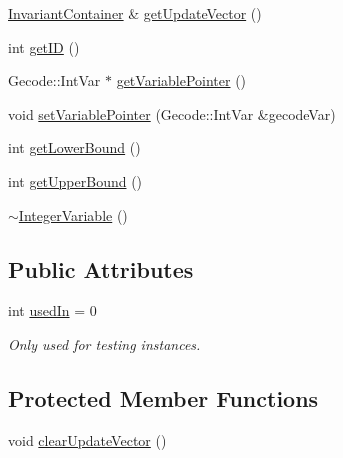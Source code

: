 \begin{DoxyCompactItemize}
\item 
\hyperlink{_constants_8hpp_a5ea9d0c2efe357d2a7f5bcd80cdf179a}{Invariant\-Container} \& \hyperlink{class_integer_variable_a20399e3432e0c85d5e182ad46bb3213c}{get\-Update\-Vector} ()
\item 
int \hyperlink{class_integer_variable_a5727e5eab36698720856f869fe29a861}{get\-I\-D} ()
\item 
Gecode\-::\-Int\-Var $\ast$ \hyperlink{class_integer_variable_a876ac87baa262f777360ee808c80520e}{get\-Variable\-Pointer} ()
\item 
void \hyperlink{class_integer_variable_aa61e4b1eff871273612179b692fc9e85}{set\-Variable\-Pointer} (Gecode\-::\-Int\-Var \&gecode\-Var)
\item 
int \hyperlink{class_integer_variable_a622dc92ec02f3abd466982a6ec677ef4}{get\-Lower\-Bound} ()
\item 
int \hyperlink{class_integer_variable_af809accc4b926b5bad3b333183d8cda0}{get\-Upper\-Bound} ()
\item 
\hyperlink{class_integer_variable_aeb6f77ae09b2951156f6d3083b11a6a9}{$\sim$\-Integer\-Variable} ()
\end{DoxyCompactItemize}
\subsection*{Public Attributes}
\begin{DoxyCompactItemize}
\item 
int \hyperlink{class_integer_variable_aa1c0490d21bfb3c86042af9407e1b369}{used\-In} = 0
\begin{DoxyCompactList}\small\item\em Only used for testing instances. \end{DoxyCompactList}\end{DoxyCompactItemize}
\subsection*{Protected Member Functions}
\begin{DoxyCompactItemize}
\item 
void \hyperlink{class_integer_variable_a40d6a9f54ab13673a1c209351f162468}{clear\-Update\-Vector} ()
\end{DoxyCompactItemize}
